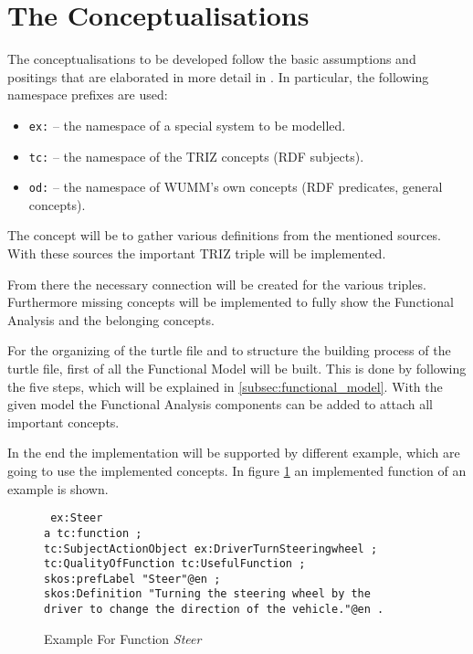 \section{The Conceptualisations}
\label{sec:conceptualisations}

The conceptualisations to be developed follow the basic assumptions and
positings that are elaborated in more detail in \cite{Graebe2021}. In
particular, the following namespace prefixes are used:
\begin{itemize}[noitemsep]
  \item \texttt{ex:} -- the namespace of a special system to be modelled. 
  \item \texttt{tc:} -- the namespace of the TRIZ concepts (RDF subjects).
  \item \texttt{od:} -- the namespace of WUMM's own concepts (RDF predicates, 
  	general concepts). 
\end{itemize}

The concept will be to gather various definitions from the mentioned sources.
With these sources the important TRIZ triple will be implemented.

From there the necessary connection will be created for the various triples.
Furthermore missing concepts will be implemented to fully show the Functional Analysis and the belonging concepts.

For the organizing of the turtle file and to structure the building process of the turtle file, first of all the Functional Model will be built. 
This is done by following the five steps, which will be explained in \ref{subsec:functional_model}.
With the given model the Functional Analysis components can be added to attach all important concepts.

In the end the implementation will be supported by different example, which are going to use the implemented concepts.
In figure \ref{fig:example_conceptionalism} an implemented function of an example is shown.

\begin{figure}[H]
    \centering
    \begin{code}\tt
        ex:Steer\\
        \> a tc:function ;\\
        \> tc:SubjectActionObject ex:DriverTurnSteeringwheel ;\\
        \> tc:QualityOfFunction tc:UsefulFunction ;\\
        \> skos:prefLabel "Steer"@en ;\\
        \> skos:Definition "Turning the steering wheel by the\\
        \> \> driver to change the direction of the vehicle."@en .
    \end{code}
    \caption{Example For Function \textit{Steer}}
    \label{fig:example_conceptionalism}
\end{figure}
